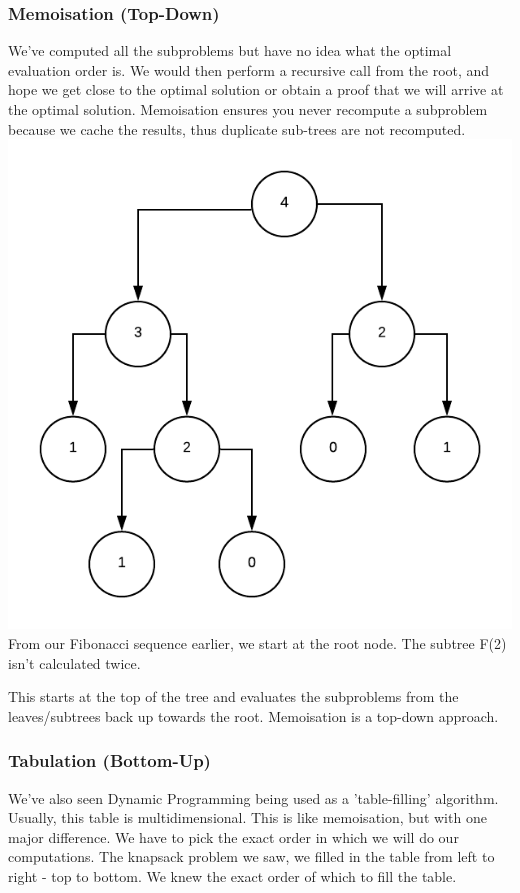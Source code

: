 \documentclass{article}
\begin{document}
\subsubsection{Memoisation (Top-Down)}
We've computed all the subproblems but have no idea what the optimal evaluation order is. We would then perform a recursive call from the root, and hope we get close to the optimal solution or obtain a proof that we will arrive at the optimal solution. Memoisation ensures you never recompute a subproblem because we cache the results, thus duplicate sub-trees are not recomputed. 
\includegraphics[width=\textwidth,height=\textheight,keepaspectratio]{ugly.png}
From our Fibonacci sequence earlier, we start at the root node. The subtree F(2) isn't calculated twice.

This starts at the top of the tree and evaluates the subproblems from the leaves/subtrees back up towards the root. Memoisation is a top-down approach.
\subsubsection{Tabulation (Bottom-Up)}
We've also seen Dynamic Programming being used as a 'table-filling' algorithm. Usually, this table is multidimensional. This is like memoisation, but with one major difference. We have to pick the exact order in which we will do our computations. The knapsack problem we saw, we filled in the table from left to right - top to bottom. We knew the exact order of which to fill the table.
\end{document}
